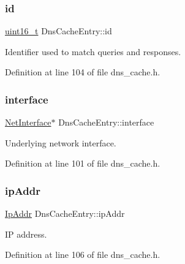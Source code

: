\subsubsection{\texorpdfstring{id}{id}}
{\footnotesize\ttfamily \hyperlink{stdint_8h_a273cf69d639a59973b6019625df33e30}{uint16\+\_\+t} Dns\+Cache\+Entry\+::id}



Identifier used to match queries and responses. 



Definition at line 104 of file dns\+\_\+cache.\+h.

\mbox{\label{structDnsCacheEntry_ad0d0a0228fc29308f59f4b2d402758e6}} 
\subsubsection{\texorpdfstring{interface}{interface}}
{\footnotesize\ttfamily \hyperlink{net_8h_a2234db8911a1148c9159979d8f5e0d6b}{Net\+Interface}$\ast$ Dns\+Cache\+Entry\+::interface}



Underlying network interface. 



Definition at line 101 of file dns\+\_\+cache.\+h.

\mbox{\label{structDnsCacheEntry_aad3958e8dcdeb2eea1a99089b2a8f5b1}} 
\subsubsection{\texorpdfstring{ip\+Addr}{ipAddr}}
{\footnotesize\ttfamily \hyperlink{structIpAddr}{Ip\+Addr} Dns\+Cache\+Entry\+::ip\+Addr}



IP address. 



Definition at line 106 of file dns\+\_\+cache.\+h.

\mbox{\label{structDnsCacheEntry_a4167197fb96cd19e4efdcd25184749c1}} 
